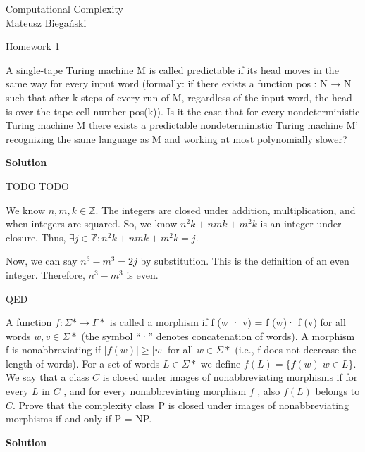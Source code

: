 \documentclass[12pt]{article}
\begin{document}

\begin{flushright}
    Computational Complexity \\
    Mateusz Biegański
\end{flushright}

\begin{center}
    \Large Homework 1 \normalsize
\end{center}

A single-tape Turing machine M is called predictable if its head moves
in the same way for every input word (formally: if there exists a function pos : N → N such
that after k steps of every run of M, regardless of the input word, the head is over the tape cell
number pos(k)). Is it the case that for every nondeterministic Turing machine M there exists
a predictable nondeterministic Turing machine M'
recognizing the same language as M and
working at most polynomially slower?

{\bf Solution}

TODO TODO

We know $n, m, k \in \mathbb{Z}$.  The integers are closed under addition, multiplication, and when integers are squared.  So, we know $n^2k + nmk + m^2k$ is an integer under closure.  Thus, $\exists j \in \mathbb{Z}: n^2k + nmk + m^2k = j$.
    
Now, we can say $n^3-m^3 = 2j$ by substitution. This is the definition of an even integer.  Therefore, $n^3-m^3$ is even.

\noindent QED

A function $f\colon\Sigma\ast\to\Gamma\ast$ is called a morphism if f (w · v) = f (w)· f (v)
for all words $w, v \in \Sigma\ast$
(the symbol “·” denotes concatenation of words). A morphism f is
nonabbreviating if $|f(w)| \ge |w|$ for all $w \in \Sigma\ast$
(i.e., f does not decrease the length of words).
For a set of words $L \in \Sigma\ast$ we define $f(L) = \{f(w) | w \in L\}$. We say that a class $C$ is closed under
images of nonabbreviating morphisms if for every  $L$ in  $C$ , and for every nonabbreviating
morphism  $f$ , also  $f(L)$ belongs to  $C$.
Prove that the complexity class P is closed under images of nonabbreviating morphisms if and only if P = NP.

{\bf Solution}
\end{document}
